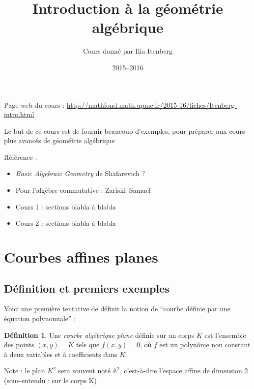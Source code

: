 \documentclass[a4paper, 11pt]{article}
\theoremstyle{definition}
\newtheorem{définition}{Définition}
\newcommand{\aff}{\mathbb{A}}
\begin{document}
\title{Introduction à la géométrie algébrique}
\author{Cours donné par Ilia Itenberg}
\date{2015--2016}

\maketitle

Page web du cours : \url{http://mathfond.math.upmc.fr/2015-16/fiches/Itenberg-intro.html}

Le but de ce cours est de fournir beaucoup d'exemples, pour préparer
aux cours plus avancés de géométrie algébrique

Référence :
\begin{itemize}
\item \textit{Basic Algebraic Geometry} de Shafarevich ?
\item Pour l'algèbre commutative : Zariski--Samuel
\end{itemize}

\begin{itemize}
\item Cours 1 : sections blabla à blabla
\item Cours 2 : sections blabla à blabla
\end{itemize}

\tableofcontents

\newpage

\section{Courbes affines planes}

\subsection{Définition et premiers exemples}

Voici une première tentative de définir la notion de \enquote{courbe
  définie par une équation polynomiale} :
\begin{définition}
  Une \emph{courbe algébrique plane} définie sur un corps $K$ est
  l'ensemble des points $(x,y) = K$ tels que $f(x,y) = 0$, où $f$ est
  un polynôme non constant à deux variables et à coefficients dans
  $K$.
\end{définition}
Note : le plan $K^2$ sera souvent noté $\aff^2$, c'est-à-dire l'espace
affine de dimension 2 (sous-entendu : sur le corps K)
\end{document}
